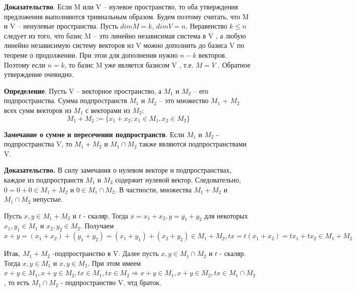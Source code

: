 \documentclass[a4paper]{article}
\begin{document}
    \begin{hproof}
        \textbf{Доказательство}. Если M или V – нулевое пространство, то оба
        утверждения предложения выполняются тривиальным образом. Будем
        поэтому считать, что M и V – ненулевые пространства. Пусть $dim M = k$,
        $dim V = n$. Неравенство $k \leq n$ следует из того, что базис M – это линейно
        независимая система в V , а любую линейно независимую систему
        векторов из V можно дополнить до базиса V по теореме о продолжении. При этои для дополнения нужно $n-k$ векторов. Поэтому если $n=k$, то базис M уже является базисом V , т.е. $M = V$ . Обратное утверждение очевидно.
    \end{hproof}

    \textbf{Определение}. Пусть V – векторное пространство, а $M_1$ и $M_2$ – его подпространства.
    Сумма подпространств $M_1$ и $M_2$ – это множество $M_1$ + $M_2$ всех сумм
    векторов из $M_1$ с векторами из $M_2$:
    \begin{equation}
        M_1+M_2 := \{ x_1 + x_2: x_1 \in M_1, x_2 \in M_2 \}
    \end{equation}

    \begin{htheorem}
        \textbf{Замечание о сумме и пересечении подпространств}. Если $M_1$ и $M_2$ - подпространства V, то $M_1+M_2$ и $M_1 \cap M_2$ также являются подпространствами V.
    \end{htheorem}

    \begin{hproof}
        \textbf{Доказательство.} В силу замечания о нулевом векторе и подпространствах,
        каждое из подпространств $M_1$ и $M_2$ содержит нулевой вектор. Следовательно, $0=0+0 \in M_1+M_2$ и $0 \in M_1 \cap M_2$. В частности, множества $M_1+M_2$ и $M_1 \cap M_2$ непустые.

        Пусть $x, y \in M_1+M_2$ и $t$ - скаляр. Тогда $x=x_1+x_2, y=y_1+y_2$ для некоторых $x_1, y_1 \in M_1$ и $x_2, y_2 \in M_2$. Получаем \begin{equation}
                                                                                                                                                  x+y = (x_1+x_2) + (y_1+y_2) = (x_1+y_1)+(x_2+y_2) \in M_1 + M_2, tx = t(x_1 + x_2) = tx_1 + tx_2 \in M_1 + M_2
        \end{equation}

        Итак, $M_1+M_2$ -подпространство в V. Далее пусть $x, y \in M_1 \cap M_2$ и $t$ - скаляр. Тогда $x, y \in M_1$ и $x, y \in M_2$. При этом имеем $x+y \in M_1, x+y \in M_2, tx \in M_1, tx \in M_2 \Rightarrow x+y \in M_1, x+y \in M_2, tx \in M_1 \cap M_2$, то есть $M_1 \cap M_2$ - подпространство V. чтд браток.
    \end{hproof}
\end{document}
